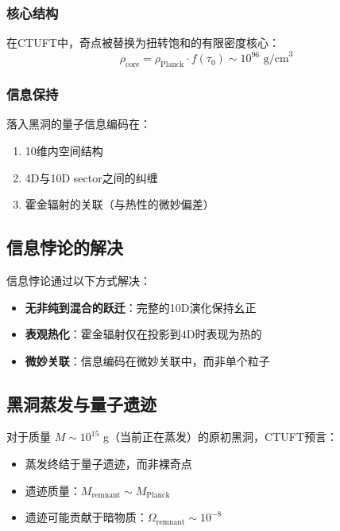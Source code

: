 \subsubsection{核心结构}

在CTUFT中，奇点被替换为扭转饱和的有限密度核心：
\begin{equation}
    \rho_{\text{core}} = \rho_{\text{Planck}} \cdot f(\tau_0) \sim 10^{96} \text{ g/cm}^3
\end{equation}

\subsubsection{信息保持}

落入黑洞的量子信息编码在：
\begin{enumerate}
    \item 10维内空间结构
    \item 4D与10D sector之间的纠缠
    \item 霍金辐射的关联（与热性的微妙偏差）
\end{enumerate}

\subsection{信息悖论的解决}

信息悖论通过以下方式解决：
\begin{itemize}
    \item \textbf{无非纯到混合的跃迁}：完整的10D演化保持幺正
    \item \textbf{表观热化}：霍金辐射仅在投影到4D时表现为热的
    \item \textbf{微妙关联}：信息编码在微妙关联中，而非单个粒子
\end{itemize}

\subsection{黑洞蒸发与量子遗迹}

对于质量 $M \sim 10^{15}$ g（当前正在蒸发）的原初黑洞，CTUFT预言：
\begin{itemize}
    \item 蒸发终结于量子遗迹，而非裸奇点
    \item 遗迹质量：$M_{\text{remnant}} \sim M_{\text{Planck}}$
    \item 遗迹可能贡献于暗物质：$\Omega_{\text{remnant}} \sim 10^{-8}$
\end{itemize}

